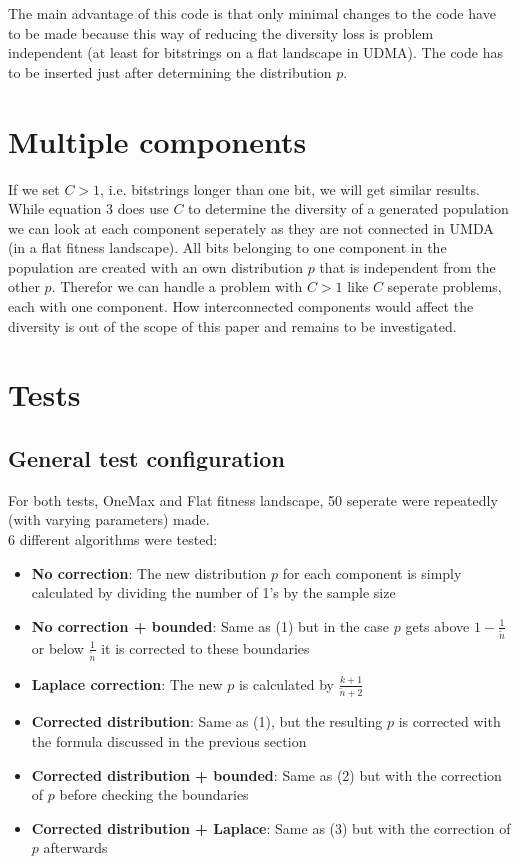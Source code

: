 \documentclass[a4paper,twoside]{report}
\begin{document}
The main advantage of this code is that only minimal changes to the code have to be made because this way of reducing the diversity loss is problem independent (at least for bitstrings on a flat landscape in UDMA). The code has to be inserted just after determining the distribution \(p\).


\section{Multiple components}

If we set \(C > 1\), i.e. bitstrings longer than one bit, we will get similar results. While equation \(3\) does use \(C\) to determine the diversity of a generated population we can look at each component seperately as they are not connected in UMDA (in a flat fitness landscape). All bits belonging to one component in the population are created with an own distribution \(p\) that is independent from the other \(p\). Therefor we can handle a problem with \(C > 1\) like \(C\) seperate problems, each with one component.
How interconnected components would affect the diversity is out of the scope of this paper and remains to be investigated.


\newpage
\section{Tests}

\subsection{General test configuration}

For both tests, OneMax and Flat fitness landscape, 50 seperate were repeatedly (with varying parameters) made.\\
6 different algorithms were tested:

\begin{itemize}
\item {\bf No correction}: The new distribution \(p\) for each component is simply calculated by dividing the number of 1's by the sample size
\item {\bf No correction + bounded}: Same as (1) but in the case \(p\) gets above \(1 - \frac{1}{\tilde{n}}\) or below \(\frac{1}{\tilde{n}}\) it is corrected to these boundaries
\item {\bf Laplace correction}: The new \(p\) is calculated by \(\frac{k + 1}{\tilde{n} + 2}\)
\item {\bf Corrected distribution}: Same as (1), but the resulting \(p\) is corrected with the formula discussed in the previous section
\item {\bf Corrected distribution + bounded}: Same as (2) but with the correction of \(p\) before checking the boundaries
\item {\bf Corrected distribution + Laplace}: Same as (3) but with the correction of \(p\) afterwards
\end{itemize}
\end{document}
